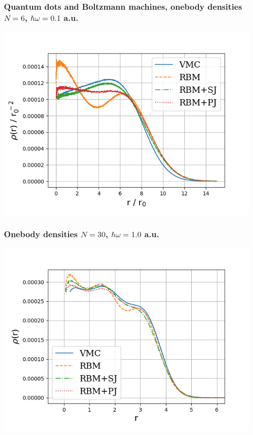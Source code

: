 \documentclass{beamer}
\begin{document}
\begin{frame}
\frametitle{Quantum dots and Boltzmann machines, onebody densities $N=6$, $\hbar\omega=0.1$ a.u.}

\begin{block}{}

\vspace{6mm}

\centerline{\includegraphics[width=0.9\linewidth]{figures/OB6hw01.png}}

\vspace{6mm}

\end{block}
\end{frame}

\begin{frame}
\frametitle{Onebody densities $N=30$, $\hbar\omega=1.0$ a.u.}

\begin{block}{}

\vspace{6mm}

\centerline{\includegraphics[width=0.9\linewidth]{figures/OB30hw1.png}}

\vspace{6mm}

\end{block}
\end{frame}
\end{document}
